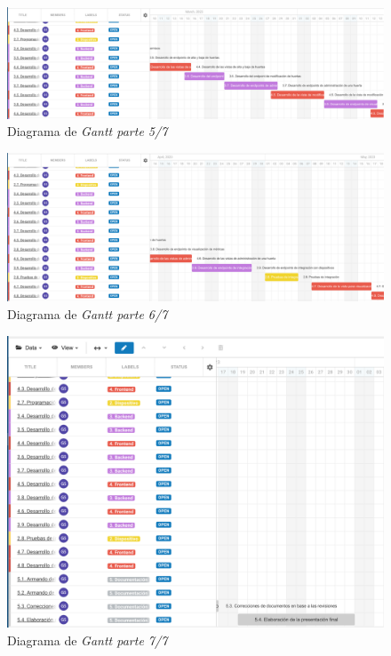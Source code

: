 \documentclass[
11pt, %
codirector, %
]{charter}
\begin{document}
\begin{figure}[htpb]
\centering 
\includegraphics[width=.999\textwidth]{./Figuras/Gantt-5.png}
\caption{Diagrama de \textit{Gantt parte 5/7}}
\label{fig:Gantt5}
\end{figure}

\begin{figure}[htpb]
\centering 
\includegraphics[width=.999\textwidth]{./Figuras/Gantt-6.png}
\caption{Diagrama de \textit{Gantt parte 6/7}}
\label{fig:Gantt6}
\end{figure}

\begin{figure}[htpb]
\centering 
\includegraphics[width=.999\textwidth]{./Figuras/Gantt-7.png}
\caption{Diagrama de \textit{Gantt parte 7/7}}
\label{fig:Gantt7}
\end{figure}
\end{document}
